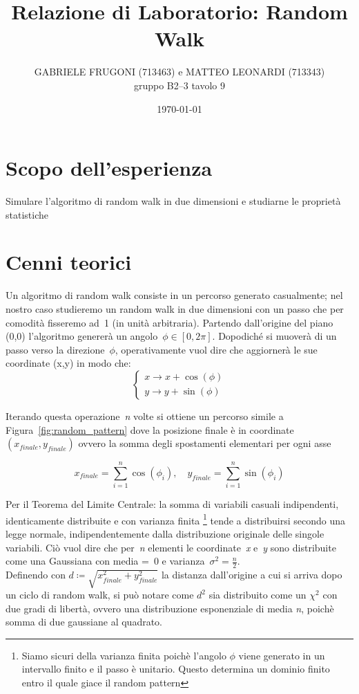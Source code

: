 \documentclass[a4paper,12pt]{article}
\title{Relazione di Laboratorio: Random Walk}       %
\author{GABRIELE FRUGONI (713463) e MATTEO LEONARDI (713343)\\ gruppo B2--3 tavolo 9}
\date{\today}
\begin{document}
\maketitle

\section{Scopo dell'esperienza}

Simulare l'algoritmo di random walk in due dimensioni e studiarne le proprietà statistiche

\section{Cenni teorici}\label{sec:cenni_teorici}

Un algoritmo di random walk consiste in un percorso generato casualmente; nel nostro caso studieremo un random walk in due dimensioni con un passo che per comodità fisseremo ad~1 (in unità arbitraria).
Partendo dall'origine del piano (0,0) l'algoritmo genererà un angolo~$\phi \in [0, 2\pi]$. Dopodiché si muoverà di un passo verso la direzione~$\phi$, operativamente vuol dire che aggiornerà le sue coordinate (x,y) in modo che:\\

\begin{equation}
    \begin{cases}
        x \rightarrow x+\cos(\phi)\\
        y \rightarrow y+\sin(\phi)
    \end{cases}
    \label{eq:step_random_walk}
\end{equation}

Iterando questa operazione~\textit{n} volte si ottiene un percorso simile a Figura~\ref{fig:random_pattern} dove la posizione finale è in coordinate $(x_{finale}, y_{finale})$ ovvero la somma degli spostamenti elementari per ogni asse

\begin{equation}
    x_{finale} = \sum_{i=1}^{n} \cos(\phi_i), \quad y_{finale} = \sum_{i=1}^{n} \sin(\phi_i)
\end{equation}

Per il Teorema del Limite Centrale: la somma di variabili casuali indipendenti, identicamente distribuite e con varianza finita%
\footnote{Siamo sicuri della varianza finita poichè l'angolo $\phi$ viene generato in un intervallo finito e il passo è unitario. Questo determina un dominio finito entro il quale giace il random pattern} 
tende a distribuirsi secondo una legge normale, indipendentemente dalla distribuzione originale delle singole variabili.
Ciò vuol dire che per~\textit{n} elementi le coordinate~\textit{x} e~\textit{y} sono distribuite come una Gaussiana con media =~0 e varianza~$\sigma^2 = \frac{n}{2}$.\\
Definendo con $d \coloneqq \sqrt{x_{finale}^2 + y_{finale}^2}$ la distanza dall'origine a cui si arriva dopo un ciclo di random walk, si può notare come $d^2$ sia distribuito come un $\chi^2$ con due gradi di libertà, ovvero una distribuzione esponenziale di media \textit{n},
poichè somma di due gaussiane al quadrato.
\end{document}

